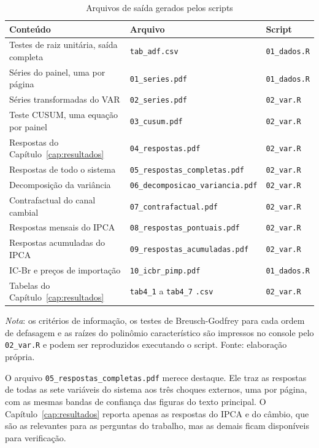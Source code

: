 \documentclass[12pt,openright,oneside,a4paper,portuguese,brazil]{abntex2}
\begin{document}
\begin{apendicesenv}
\begin{table}[htbp]
\centering
\caption{Arquivos de saída gerados pelos scripts}
\label{tab:saidas}
\footnotesize
\begin{tabular}{lll}
\toprule
Conteúdo & Arquivo & Script \\
\midrule
Testes de raiz unitária, saída completa & \texttt{tab\_adf.csv} & \texttt{01\_dados.R} \\
Séries do painel, uma por página        & \texttt{01\_series.pdf} & \texttt{01\_dados.R} \\
Séries transformadas do VAR             & \texttt{02\_series.pdf} & \texttt{02\_var.R} \\
Teste CUSUM, uma equação por painel     & \texttt{03\_cusum.pdf} & \texttt{02\_var.R} \\
Respostas do Capítulo~\ref{cap:resultados} & \texttt{04\_respostas.pdf} & \texttt{02\_var.R} \\
Respostas de todo o sistema             & \texttt{05\_respostas\_completas.pdf} & \texttt{02\_var.R} \\
Decomposição da variância               & \texttt{06\_decomposicao\_variancia.pdf} & \texttt{02\_var.R} \\
Contrafactual do canal cambial          & \texttt{07\_contrafactual.pdf} & \texttt{02\_var.R} \\
Respostas mensais do IPCA               & \texttt{08\_respostas\_pontuais.pdf} & \texttt{02\_var.R} \\
Respostas acumuladas do IPCA            & \texttt{09\_respostas\_acumuladas.pdf} & \texttt{02\_var.R} \\
IC-Br e preços de importação            & \texttt{10\_icbr\_pimp.pdf} & \texttt{01\_dados.R} \\
Tabelas do Capítulo~\ref{cap:resultados} & \texttt{tab4\_1} a \texttt{tab4\_7} \texttt{.csv} & \texttt{02\_var.R} \\
\bottomrule
\end{tabular}

\vspace{2pt}
\begin{flushleft}\footnotesize
\textit{Nota}: os critérios de informação, os testes de Breusch-Godfrey para
cada ordem de defasagem e as raízes do polinômio característico são impressos
no console pelo \texttt{02\_var.R} e podem ser reproduzidos executando o
script. Fonte: elaboração própria.
\end{flushleft}
\end{table}

O arquivo \texttt{05\_respostas\_completas.pdf} merece destaque. Ele
traz as respostas de todas as sete variáveis do sistema aos três choques
externos, uma por página, com as mesmas bandas de confiança das figuras do
texto principal. O Capítulo~\ref{cap:resultados} reporta apenas as respostas do
IPCA e do câmbio, que são as relevantes para as perguntas do trabalho, mas as
demais ficam disponíveis para verificação.

\end{apendicesenv}
\end{document}

